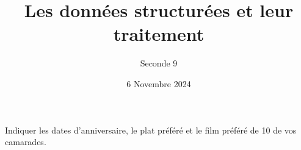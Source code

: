 \documentclass{exam}
\title{Les données structurées et leur traitement}
\date{6 Novembre 2024}
\author{Seconde 9}
\begin{document}
\maketitle

\begin{questions}
\question Indiquer les dates d'anniversaire, le plat préféré et le film préféré de 10 de vos camarades.
\makeemptybox{7cm}
\end{questions}
\end{document}
